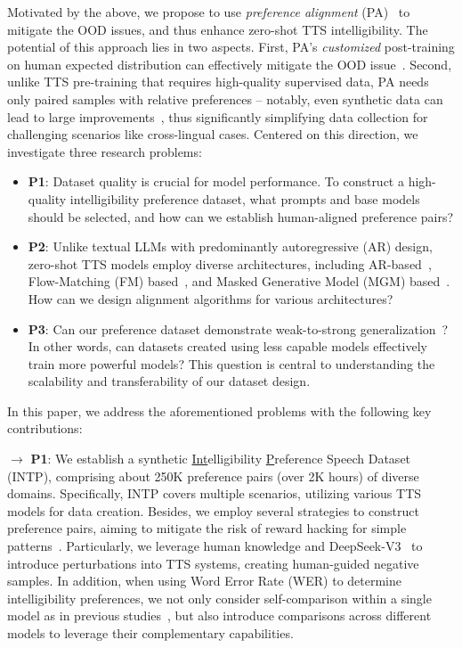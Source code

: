 \documentclass[11pt]{article}
\begin{document}
Motivated by the above, we propose to use \textit{preference alignment} (PA)~\cite{instructgpt,RLHF-anthoropic} to mitigate the OOD issues, and thus enhance zero-shot TTS intelligibility. The potential of this approach lies in two aspects. 
First, PA's \textit{customized} post-training on human expected distribution can effectively mitigate the OOD issue~\cite{zhang2024negative,li2024rl, iterative-dpo}. Second, unlike TTS pre-training that requires high-quality supervised data, PA needs only paired samples with relative preferences -- notably, even synthetic data can lead to large improvements~\cite{llama3,qwen2.5}, thus significantly simplifying data collection for challenging scenarios like cross-lingual cases. Centered on this direction, we investigate three research problems:
\vspace{-1mm}
\begin{itemize}[itemsep=0ex,leftmargin=2ex]
    \item \textbf{P1}: Dataset quality is crucial for model performance. To construct a high-quality intelligibility preference dataset, what prompts and base models should be selected, and how can we establish human-aligned preference pairs?
    \item \textbf{P2}: Unlike textual LLMs with predominantly autoregressive (AR) design, zero-shot TTS models employ diverse architectures, including AR-based~\cite{audiolm,seedtts,cosyvoice2}, Flow-Matching (FM) based~\cite{voicebox,e2tts,f5tts}, and Masked Generative Model (MGM) based~\cite{naturalspeech3,maskgct}. How can we design alignment algorithms for various architectures?
    \item \textbf{P3}: Can our preference dataset demonstrate weak-to-strong generalization~\cite{weak-to-strong-generalization}? In other words, can datasets created using less capable models effectively train more powerful models? This question is central to understanding the scalability and transferability of our dataset design.
\end{itemize}

In this paper, we address the aforementioned problems with the following key contributions:

$\rightarrow$ \textbf{P1}: We establish a synthetic \underline{Int}elligibility \underline{P}reference Speech Dataset (INTP), comprising about 250K preference pairs (over 2K hours) of diverse domains. Specifically, INTP covers multiple scenarios, utilizing various TTS models for data creation. Besides, we employ several strategies to construct preference pairs, aiming to mitigate the risk of reward hacking for simple patterns~\cite{reward-hacking,reward-hacking-wenglilian}. Particularly, we leverage human knowledge and DeepSeek-V3~\cite{deepseek-v3} to introduce perturbations into TTS systems, creating human-guided negative samples. In addition, when using Word Error Rate (WER) to determine intelligibility preferences, we not only consider self-comparison within a single model as in previous studies~\cite{tianjinchuan-pa,fpo,koel-tts}, but also introduce comparisons across different models to leverage their complementary capabilities.
\end{document}
